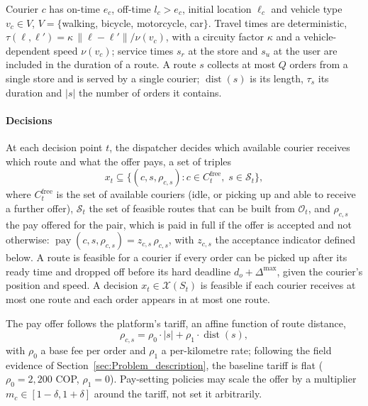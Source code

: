 \documentclass[a4paper,11pt,review,3p,authoryear]{elsarticle}
\DeclareMathOperator{\dist}{dist}
\DeclareMathOperator{\pay}{pay}
\begin{document}
Courier $c$ has on-time $e_c$, off-time $l_c > e_c$, initial location $\ell_c$ and vehicle type $v_c \in V$, $V = \{$walking, bicycle, motorcycle, car$\}$. Travel times are deterministic, $\tau(\ell, \ell') = \kappa\, \|\ell - \ell'\| / \nu(v_c)$, with a circuity factor $\kappa$ and a vehicle-dependent speed $\nu(v_c)$; service times $s_r$ at the store and $s_u$ at the user are included in the duration of a route. A route $s$ collects at most $Q$ orders from a single store and is served by a single courier; $\dist(s)$ is its length, $\tau_s$ its duration and $|s|$ the number of orders it contains.

\paragraph{Decisions}

At each decision point $t$, the dispatcher decides which available courier receives which route and what the offer pays, a set of triples
\begin{equation}
x_t \subseteq \bigl\{(c, s, \rho_{c,s}) : c \in C_t^{\text{free}},\; s \in \mathcal{S}_t\bigr\},
\label{eqn:decision}
\end{equation}
where $C_t^{\text{free}}$ is the set of available couriers (idle, or picking up and able to receive a further offer), $\mathcal{S}_t$ the set of feasible routes that can be built from $\mathcal{O}_t$, and $\rho_{c,s}$ the pay offered for the pair, which is paid in full if the offer is accepted and not otherwise: $\pay(c, s, \rho_{c,s}) = z_{c,s}\, \rho_{c,s}$, with $z_{c,s}$ the acceptance indicator defined below. A route is feasible for a courier if every order can be picked up after its ready time and dropped off before its hard deadline $d_o + \Delta^{\max}$, given the courier's position and speed. A decision $x_t \in \mathcal{X}(S_t)$ is feasible if each courier receives at most one route and each order appears in at most one route.

The pay offer follows the platform's tariff, an affine function of route distance,
\begin{equation}
\rho_{c,s} = \rho_0 \cdot |s| + \rho_1 \cdot \dist(s),
\label{eqn:tariff}
\end{equation}
with $\rho_0$ a base fee per order and $\rho_1$ a per-kilometre rate; following the field evidence of Section~\ref{sec:Problem_description}, the baseline tariff is flat ($\rho_0 = 2{,}200$ COP, $\rho_1 = 0$). Pay-setting policies may scale the offer by a multiplier $m_c \in [1-\delta, 1+\delta]$ around the tariff, not set it arbitrarily.
\end{document}
